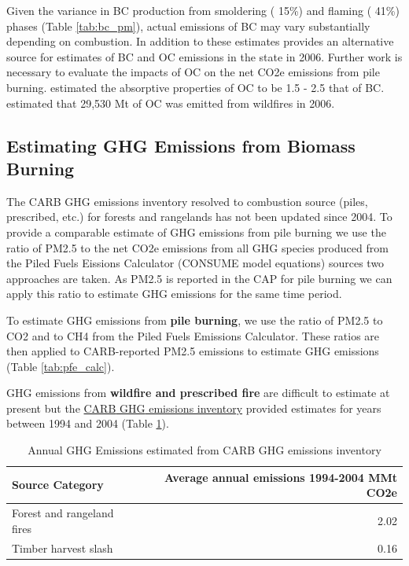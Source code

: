 \documentclass[a4paper]{article}
\begin{document}
Given the variance in \ac{BC} production from smoldering (\textpm{} 15\%) and flaming (\textpm{} 41\%) phases (Table \ref{tab:bc_pm}), actual emissions of \ac{BC}  may vary substantially depending on combustion. In addition to these estimates \cite{Chow2010} provides an alternative source for estimates of \ac{BC} and \ac{OC} emissions in the state in 2006. Further work is necessary to evaluate the impacts of \ac{OC} on the net \ac{CO2e} emissions from pile burning. \cite{Pokhrel2016} estimated the absorptive properties of \ac{OC} to be 1.5 - 2.5 that of \ac{BC}. \cite{Chow2010} estimated that 29,530 Mt of \ac{OC} was emitted from wildfires in 2006. 

\subsection{Estimating \ac{GHG} Emissions from Biomass Burning}
\label{sec:orgheadline7}
The \ac{CARB} GHG emissions inventory resolved to combustion source (piles, prescribed, etc.) for forests and rangelands has not been updated since 2004. To provide a comparable estimate of GHG emissions from pile burning we use the ratio of \ac{PM2.5} to the net \ac{CO2e} emissions from all \ac{GHG} species produced from the Piled Fuels Eissions Calculator (CONSUME model equations) sources two approaches are taken. As \ac{PM2.5} is reported in the \ac{CAP} for pile burning we can apply this ratio to estimate \ac{GHG} emissions for the same time period.


To estimate \ac{GHG} emissions from \textbf{pile burning}, we use the ratio of
\ac{PM2.5} to CO2 and to CH4 from the Piled Fuels Emissions Calculator. These ratios are then applied to \ac{CARB}-reported \ac{PM2.5} emissions to estimate \ac{GHG} emissions (Table \ref{tab:pfe_calc}).


\ac{GHG} emissions from \textbf{wildfire and prescribed fire} are difficult to estimate at present but the
\href{http://www.arb.ca.gov/cc/inventory/archive/tables/net_co2_flux_2007-11-19.pdf}{\ac{CARB} \ac{GHG} emissions inventory} provided estimates for years between 1994 and 2004 (Table \ref{arb_ghg_2004}).

\begin{table}[htb]
\centering
\begin{tabular}{lr}
Source Category & Average annual emissions 1994-2004 MMt CO2e\\
\hline
Forest and rangeland fires & 2.02\\
Timber harvest slash & 0.16\\
\end{tabular}
\caption{Annual \ac{GHG} Emissions estimated from CARB \ac{GHG} emissions inventory \label{arb_ghg_2004}}

\end{table}
\end{document}
